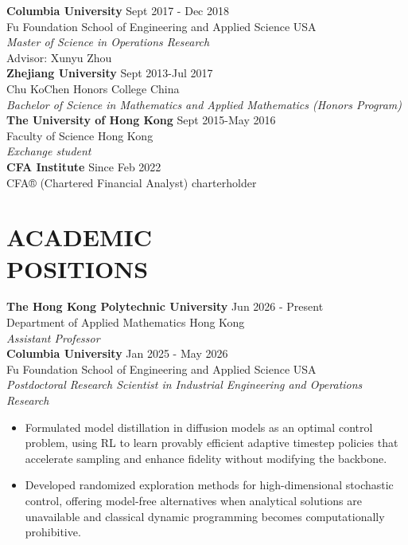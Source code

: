 \documentclass[margin, 10pt]{res} %
\begin{document}
\begin{resume}
\textbf{Columbia University} \hfill Sept 2017 - Dec 2018\\
Fu Foundation School of Engineering and Applied Science \hfill USA\\
{\sl Master of Science in Operations Research }  \\
Advisor: Xunyu Zhou\\

\textbf{Zhejiang University} \hfill Sept 2013-Jul 2017\\
Chu KoChen Honors College \hfill China\\
{\sl Bachelor of Science in Mathematics and Applied Mathematics (Honors Program)}  \\

\textbf{The University of Hong Kong} \hfill Sept 2015-May 2016\\
Faculty of Science \hfill Hong Kong\\
{\sl Exchange student}  \\

\textbf{CFA Institute} \hfill Since Feb 2022\\
CFA® (Chartered Financial Analyst) charterholder  \\





\section{ACADEMIC \\ POSITIONS}

\textbf{The Hong Kong Polytechnic University} \hfill Jun 2026 - Present\\
Department of Applied Mathematics \hfill Hong Kong\\
{\sl Assistant Professor}\\

\textbf{Columbia University} \hfill Jan 2025 - May 2026\\
Fu Foundation School of Engineering and Applied Science \hfill USA\\
{\sl Postdoctoral Research Scientist in Industrial Engineering and Operations Research }   \\
\begin{itemize}
    \item Formulated model distillation in diffusion models as an optimal control problem, using RL to learn provably efficient adaptive timestep policies that accelerate sampling and enhance fidelity without modifying the backbone.
    \item Developed randomized exploration methods for high-dimensional stochastic control, offering model-free alternatives when analytical solutions are unavailable and classical dynamic programming becomes computationally prohibitive.
\end{itemize}









\end{resume}
\end{document}

